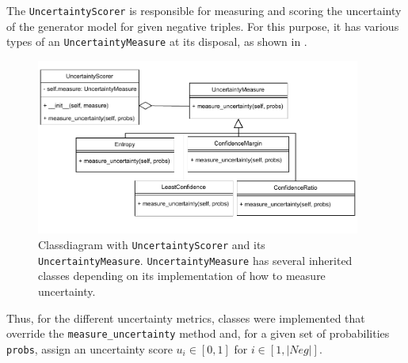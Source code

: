 The \texttt{UncertaintyScorer} is responsible for measuring and scoring the uncertainty of the generator model for given negative triples.
For this purpose, it has various types of an \texttt{UncertaintyMeasure} at its disposal, as shown in .
\begin{figure}[t]
  \centering
    \includegraphics[width=0.95\textwidth]{figures/classdiagrams/UncertaintyScorer.pdf}
  \caption{Classdiagram with \texttt{UncertaintyScorer} and its \texttt{UncertaintyMeasure}.
  \texttt{UncertaintyMeasure} has several inherited classes depending on its implementation of how to measure uncertainty.}
  \label{fig:uncertainty_measures}
\end{figure}
Thus, for the different uncertainty metrics, classes were implemented that override the \texttt{measure\_uncertainty} method and, for a given set of probabilities \texttt{probs}, assign an uncertainty score $u_i \in [0,1]$ for $i \in [1, |Neg|]$.